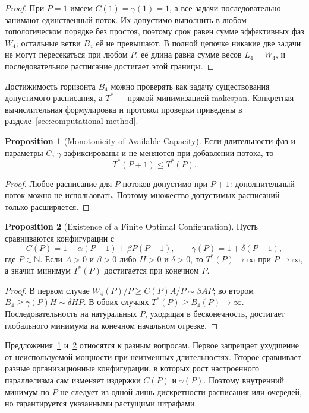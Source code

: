 \documentclass[12pt,a4paper]{article}
\theoremstyle{definition}
\newtheorem{proposition}{Proposition}
\begin{document}
\begin{proof}
При $P=1$ имеем $C(1)=\gamma(1)=1$, а все задачи последовательно занимают
единственный поток. Их допустимо выполнить в любом топологическом порядке без
простоя, поэтому срок равен сумме эффективных фаз $W_4$; остальные ветви
$B_4$ её не превышают. В полной цепочке никакие две задачи не могут
пересекаться при любом $P$, её длина равна сумме весов $L_4=W_4$, и
последовательное расписание достигает этой границы.
\end{proof}

Достижимость горизонта $B_4$ можно проверять как задачу существования
допустимого расписания, а $T^{*}$ --- прямой минимизацией makespan. Конкретная
вычислительная формулировка и протокол проверки приведены в
разделе~\ref{sec:computational-method}.

\begin{proposition}[Monotonicity of Available Capacity]\label{prop:capacity-monotonicity}
Если длительности фаз и параметры $C$, $\gamma$ зафиксированы и не меняются при добавлении потока, то
\[
  T^{*}(P+1)\le T^{*}(P).
\]
\end{proposition}

\begin{proof}
Любое расписание для $P$ потоков допустимо при $P+1$: дополнительный поток можно не использовать. Поэтому множество допустимых расписаний только расширяется.
\end{proof}

\begin{proposition}[Existence of a Finite Optimal Configuration]\label{prop:finite-optimum}
Пусть сравниваются конфигурации с
\[
 C(P)=1+\alpha(P-1)+\beta P(P-1),\qquad
 \gamma(P)=1+\delta(P-1),
\]
где $P\in\mathbb N$. Если $A>0$ и $\beta>0$ либо $H>0$ и $\delta>0$, то $T^{*}(P)\to\infty$ при $P\to\infty$, а значит минимум $T^{*}(P)$ достигается при конечном $P$.
\end{proposition}

\begin{proof}
В первом случае $W_4(P)/P\ge C(P)A/P\sim\beta AP$; во втором $B_4\ge\gamma(P)H\sim\delta HP$. В обоих случаях $T^{*}(P)\ge B_4(P)\to\infty$. Последовательность на натуральных $P$, уходящая в бесконечность, достигает глобального минимума на конечном начальном отрезке.
\end{proof}

Предложения~\ref{prop:capacity-monotonicity} и~\ref{prop:finite-optimum} относятся к разным вопросам. Первое запрещает ухудшение от неиспользуемой мощности при неизменных длительностях. Второе сравнивает разные организационные конфигурации, в которых рост настроенного параллелизма сам изменяет издержки $C(P)$ и $\gamma(P)$. Поэтому внутренний минимум по $P$ не следует из одной лишь дискретности расписания или очередей, но гарантируется указанными растущими штрафами.
\end{document}
